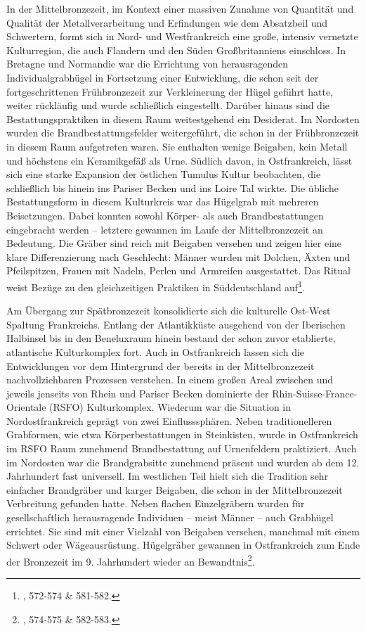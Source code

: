 \documentclass[openany,twoside,twocolumn]{book}
\let\rmarkdownfootnote\footnote%
\def\footnote{\protect\rmarkdownfootnote}
\begin{document}
In der Mittelbronzezeit, im Kontext einer massiven Zunahme von Quantität
und Qualität der Metallverarbeitung und Erfindungen wie dem Absatzbeil
und Schwertern, formt sich in Nord- und Westfrankreich eine große,
intensiv vernetzte Kulturregion, die auch Flandern und den Süden
Großbritanniens einschloss. In Bretagne und Normandie war die Errichtung
von herausragenden Individualgrabhügel in Fortsetzung einer Entwicklung,
die schon seit der fortgeschrittenen Frühbronzezeit zur Verkleinerung
der Hügel geführt hatte, weiter rückläufig und wurde schließlich
eingestellt. Darüber hinaus sind die Bestattungspraktiken in diesem Raum
weitestgehend ein Desiderat. Im Nordosten wurden die
Brandbestattungsfelder weitergeführt, die schon in der Frühbronzezeit in
diesem Raum aufgetreten waren. Sie enthalten wenige Beigaben, kein
Metall und höchstens ein Keramikgefäß als Urne. Südlich davon, in
Ostfrankreich, lässt sich eine starke Expansion der östlichen Tumulus
Kultur beobachten, die schließlich bis hinein ins Pariser Becken und ins
Loire Tal wirkte. Die übliche Bestattungsform in diesem Kulturkreis war
das Hügelgrab mit mehreren Beisetzungen. Dabei konnten sowohl Körper-
als auch Brandbestattungen eingebracht werden -- letztere gewannen im
Laufe der Mittelbronzezeit an Bedeutung. Die Gräber sind reich mit
Beigaben versehen und zeigen hier eine klare Differenzierung nach
Geschlecht: Männer wurden mit Dolchen, Äxten und Pfeilspitzen, Frauen
mit Nadeln, Perlen und Armreifen ausgestattet. Das Ritual weist Bezüge
zu den gleichzeitigen Praktiken in Süddeutschland auf\footnote{\textcite{mordant_bronze_2013},
  572-574 \& 581-582.}.

Am Übergang zur Spätbronzezeit konsolidierte sich die kulturelle
Ost-West Spaltung Frankreichs. Entlang der Atlantikküste ausgehend von
der Iberischen Halbinsel bis in den Beneluxraum hinein bestand der schon
zuvor etablierte, atlantische Kulturkomplex fort. Auch in Ostfrankreich
lassen sich die Entwicklungen vor dem Hintergrund der bereits in der
Mittelbronzezeit nachvollziehbaren Prozessen verstehen. In einem großen
Areal zwischen und jeweils jenseits von Rhein und Pariser Becken
dominierte der Rhin-Suisse-France-Orientale (RSFO) Kulturkomplex.
Wiederum war die Situation in Nordostfrankreich geprägt von zwei
Einflusssphären. Neben traditionelleren Grabformen, wie etwa
Körperbestattungen in Steinkisten, wurde in Ostfrankreich im RSFO Raum
zunehmend Brandbestattung auf Urnenfeldern praktiziert. Auch im
Nordosten war die Brandgrabsitte zunehmend präsent und wurden ab dem 12.
Jahrhundert fast universell. Im westlichen Teil hielt sich die Tradition
sehr einfacher Brandgräber und karger Beigaben, die schon in der
Mittelbronzezeit Verbreitung gefunden hatte. Neben flachen Einzelgräbern
wurden für gesellschaftlich herausragende Individuen -- meist Männer --
auch Grabhügel errichtet. Sie sind mit einer Vielzahl von Beigaben
versehen, manchmal mit einem Schwert oder Wägeausrüstung. Hügelgräber
gewannen in Ostfrankreich zum Ende der Bronzezeit im 9. Jahrhundert
wieder an Bewandtnis\footnote{\textcite{mordant_bronze_2013}, 574-575 \&
  582-583.}.
\end{document}
